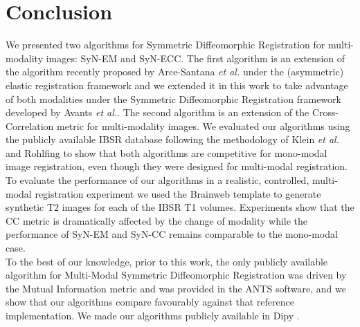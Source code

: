 \section{Conclusion}
We presented two algorithms for Symmetric Diffeomorphic Registration for multi-modality images: SyN-EM and SyN-ECC. The first algorithm is an extension of the algorithm recently proposed by Arce-Santana {\it et al.} \cite{Arce-santana2014} under the (asymmetric) elastic registration framework and we extended it in this work to take advantage of both modalities under the Symmetric Diffeomorphic Registration framework developed by Avants {\it et al.}. The second algorithm is an extension of the Cross-Correlation metric for multi-modality images. We evaluated our algorithms using the publicly available IBSR database following the methodology of Klein {\it et al.} \cite{Klein2009}\cite{Klein2010} and
Rohlfing \cite{Rohlfing2012} to show that both algorithms are competitive for mono-modal image registration, even though they were designed for multi-modal registration.
To evaluate the performance of our algorithms in a realistic, controlled, multi-modal registration experiment we used the Brainweb \cite{Cocosco1997}\cite{Kwan1999} template
to generate synthetic T2 images for each of the IBSR T1 volumes. Experiments show that the CC metric is dramatically affected by the change of modality while the performance of
SyN-EM and SyN-CC remains comparable to the mono-modal case.\\

To the best of our knowledge, prior to this work, the only publicly available algorithm for Multi-Modal Symmetric Diffeomorphic Registration was driven by the Mutual Information
metric and was provided in the ANTS software, and we show that our algorithms compare favourably against that reference implementation. We made our algorithms
publicly available in Dipy \cite{Garyfallidis2014}.
